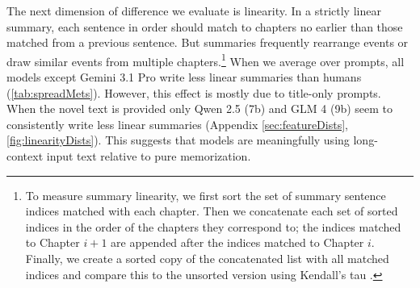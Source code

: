 \documentclass{article} %
\begin{document}
The next dimension of difference we evaluate is linearity.
In a strictly linear summary, each sentence in order should match to chapters no earlier than those matched from a previous sentence.
But summaries frequently rearrange events or draw similar events from multiple chapters.\footnote{To measure summary linearity, we first sort the set of summary sentence indices matched with each chapter. Then we concatenate each set of sorted indices in the order of the chapters they correspond to; the indices matched to Chapter $i+1$ are appended after the indices matched to Chapter $i$. Finally, we create a sorted copy of the concatenated list with all matched indices and compare this to the unsorted version using Kendall's tau \citep{kendall1945treatment}.} When we average over prompts, all models except Gemini 3.1 Pro write less linear summaries than humans (\cref{tab:spreadMets}). However, this effect is mostly due to title-only prompts.
When the novel text is provided only Qwen 2.5 (7b) and GLM 4 (9b) seem to consistently write less linear summaries (Appendix \ref{sec:featureDists}, \cref{fig:linearityDists}).
This suggests that models are meaningfully using long-context input text relative to pure memorization.
\end{document}
